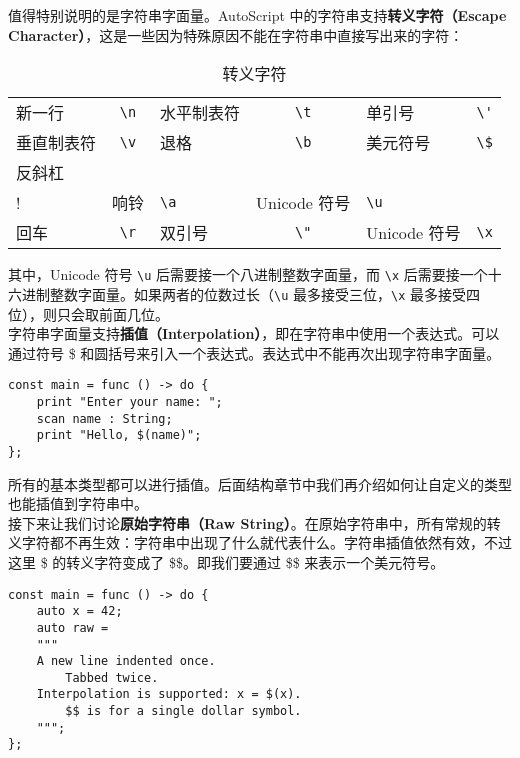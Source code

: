值得特别说明的是字符串字面量。AutoScript 中的字符串支持\textbf{转义字符（Escape Character）}，这是一些因为特殊原因不能在字符串中直接写出来的字符：

\begin{table}[h]
    \centering
    \begin{tabular}{l c l c l c}
        新一行 & \lstinline!\n! & 水平制表符 & \lstinline!\t! & 单引号 & \lstinline!\'! \\
        垂直制表符 & \lstinline!\v! & 退格 & \lstinline!\b! & 美元符号 & \lstinline!\$! \\
        反斜杠 & \lstinline!\\! & 响铃 & \lstinline!\a! & Unicode 符号 & \lstinline!\u! \\
        回车 & \lstinline!\r! & 双引号 & \lstinline!\"! & Unicode 符号 & \lstinline!\x! \\
    \end{tabular}
    \caption{转义字符}
    \label{tab:escape-characters}
\end{table}

其中，Unicode 符号 \lstinline!\u! 后需要接一个八进制整数字面量，而 \lstinline!\x! 后需要接一个十六进制整数字面量。如果两者的位数过长（\lstinline!\u! 最多接受三位，\lstinline!\x! 最多接受四位），则只会取前面几位。 \\

字符串字面量支持\textbf{插值（Interpolation）}，即在字符串中使用一个表达式。可以通过符号 \$ 和圆括号来引入一个表达式。表达式中不能再次出现字符串字面量。

\begin{lstlisting}
const main = func () -> do {
    print "Enter your name: ";
    scan name : String;
    print "Hello, $(name)";
};
\end{lstlisting}

所有的基本类型都可以进行插值。后面结构章节中我们再介绍如何让自定义的类型也能插值到字符串中。 \\

接下来让我们讨论\textbf{原始字符串（Raw String）}。在原始字符串中，所有常规的转义字符都不再生效：字符串中出现了什么就代表什么。字符串插值依然有效，不过这里 \$ 的转义字符变成了 \$\$。即我们要通过 \$\$ 来表示一个美元符号。

\begin{lstlisting}
const main = func () -> do {
    auto x = 42;
    auto raw = 
    """
    A new line indented once.
        Tabbed twice.
    Interpolation is supported: x = $(x).
        $$ is for a single dollar symbol.
    """;
};
\end{lstlisting}


